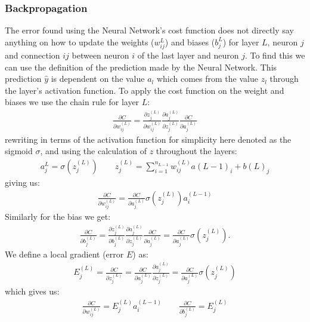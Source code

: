 \documentclass[11pt]{article}
\begin{document}
\subsubsection*{Backpropagation}
The error found using the Neural Network's cost function does not directly say anything on how to update the weights ($w_{ij}^{L}$) and biases ($b_{j}^{L}$) for layer $L$, neuron $j$ and connection $ij$ between neuron $i$ of the last layer and neuron $j$. To find this we can use the definition of the prediction made by the Neural Network. This prediction $\hat{y}$ is dependent on the value $a_l$ which comes from the value $z_l$ through the layer's activation function. To apply the cost function on the weight and biases we use the chain rule for layer $L$:
\begin{align*}
    \frac{\partial C}{\partial w^{(L)}_{ij}}  = \frac{\partial z^{(L)}_j}{\partial w^{(L)}_{ij}}  \frac{\partial a^{(L)}_{j}}{\partial z^{(L)}_j}  \frac{\partial C}{\partial a^{(L)}_j}
\end{align*}
rewriting in terms of the activation function for simplicity here denoted as the sigmoid $\sigma$, and using the calculation of $z$ throughout the layers:
\begin{align*}
    a_j^L = \sigma(z_j^{(L)}) \quad\quad z_j^{(L)} = \sum_{i=1}^{n_{L-1}}w^{(L)}_{ij}a{(L-1)}_{i} + b{(L)}_{j}
\end{align*}
giving us:
\begin{align*}
    \frac{\partial C}{\partial w^{(L)}_{ij}} = \frac{\partial C}{\partial a^{(L)}_{j}}\sigma(z_j^{(L)})a_i^{(L-1)}
\end{align*}
Similarly for the bias we get:
\begin{align*}
    \frac{\partial C}{\partial b^{(L)}_{j}} = \frac{\partial z^{(L)}_j}{\partial b^{(L)}_{j}}  \frac{\partial a^{(L)}_{j}}{\partial z^{(L)}_j}  \frac{\partial C}{\partial a^{(L)}_j} =
    \frac{\partial C}{\partial a^{(L)}_{j}}\sigma(z_j^{(L)}).
\end{align*}
We define a local gradient (error $E$) as:
\begin{align*}
    E_j^{(L)} = \frac{\partial C }{\partial z_j^{(L)}} = \frac{\partial C }{\partial a_j^{(L)}}\frac{\partial a_j^{(L)} }{\partial z_j^{(L)}} = \frac{\partial C }{\partial a_j^{(L)}} \sigma(z_j^{(L)})
\end{align*}
which gives us:
\begin{align*}
    \frac{\partial C }{\partial w_{ij}^{(L)}} = E_j^{(L)} a_i^{(L-1)} \quad\quad
    \frac{\partial C }{\partial b_{j}^{(L)}} = E_j^{(L)}
\end{align*}
\end{document}
